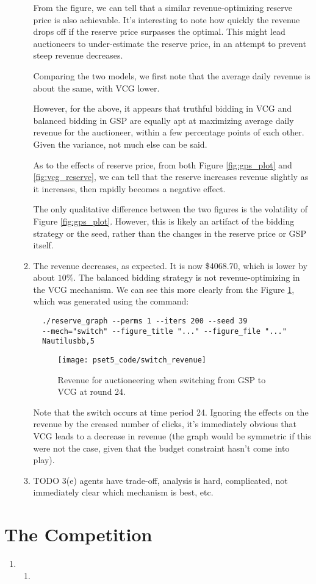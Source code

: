 \documentclass[11pt]{article}
\begin{document}
\begin{enumerate}[resume]
\begin{enumerate}
  From the figure, we can tell that a similar revenue-optimizing reserve price is also achievable. It's interesting to note how quickly the revenue drops off if the reserve price surpasses the optimal. This might lead auctioneers to under-estimate the reserve price, in an attempt to prevent steep revenue decreases.

  Comparing the two models, we first note that the average daily revenue is about the same, with VCG lower. 

  However, for the above, it appears that truthful bidding in VCG and balanced bidding in GSP are equally apt at maximizing average daily revenue for the auctioneer, within a few percentage points of each other. Given the variance, not much else can be said.

  As to the effects of reserve price, from both Figure \ref{fig:gps_plot} and \ref{fig:vcg_reserve}, we can tell that the reserve increases revenue slightly as it increases, then rapidly becomes a negative effect. 

  The only qualitative difference between the two figures is the volatility of Figure \ref{fig:gps_plot}. However, this is likely an artifact of the bidding strategy or the seed, rather than the changes in the reserve price or GSP itself.

  \item The revenue decreases, as expected. It is now \$4068.70, which is lower by about $10\%$.  The balanced bidding strategy is not revenue-optimizing in the VCG mechanism. We can see this more clearly from the Figure \ref{fig:switch}, which was generated using the command:
   \begin{lstlisting}
  ./reserve_graph --perms 1 --iters 200 --seed 39 
  --mech="switch" --figure_title "..." --figure_file "..." 
  Nautilusbb,5
  \end{lstlisting}

  \begin{figure}[h!]
    \centering
    \texttt{[image: pset5\_code/switch\_revenue]}
    \caption{Revenue for auctioneering when switching from GSP to VCG at round 24.}
    \label{fig:switch}
  \end{figure}
  Note that the switch occurs at time period 24. Ignoring the effects on the revenue by the creased number of clicks, it's immediately obvious that VCG leads to a decrease in revenue (the graph would be symmetric if this were not the case, given that the budget constraint hasn't come into play). 
  \item TODO 3(e)
  agents have trade-off, analysis is hard, complicated, not immediately clear which mechanism is best, etc. 
  \end{enumerate}
\end{enumerate}

\section*{The Competition}
\begin{enumerate}[resume]
\item
  \begin{enumerate}
  \item 
  \end{enumerate}
\end{enumerate}
\end{document}
